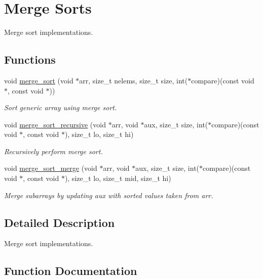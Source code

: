 \hypertarget{group__MergeSort}{}\section{Merge Sorts}
\label{group__MergeSort}


Merge sort implementations.  


\subsection*{Functions}
\begin{DoxyCompactItemize}
\item 
void \hyperlink{group__MergeSort_ga9e7f6cf0117297b84135e76a00711d82}{merge\+\_\+sort} (void $\ast$arr, size\+\_\+t nelems, size\+\_\+t size, int($\ast$compare)(const void $\ast$, const void $\ast$))
\begin{DoxyCompactList}\small\item\em Sort generic array using merge sort. \end{DoxyCompactList}\item 
void \hyperlink{group__MergeSort_ga4094395ddbe4c74b46b6f011a83ceb46}{merge\+\_\+sort\+\_\+recursive} (void $\ast$arr, void $\ast$aux, size\+\_\+t size, int($\ast$compare)(const void $\ast$, const void $\ast$), size\+\_\+t lo, size\+\_\+t hi)
\begin{DoxyCompactList}\small\item\em Recursively perform merge sort. \end{DoxyCompactList}\item 
void \hyperlink{group__MergeSort_ga1b4d8f0a083e4f0d30291ce8829ba6fe}{merge\+\_\+sort\+\_\+merge} (void $\ast$arr, void $\ast$aux, size\+\_\+t size, int($\ast$compare)(const void $\ast$, const void $\ast$), size\+\_\+t lo, size\+\_\+t mid, size\+\_\+t hi)
\begin{DoxyCompactList}\small\item\em Merge subarrays by updating aux with sorted values taken from arr. \end{DoxyCompactList}\end{DoxyCompactItemize}


\subsection{Detailed Description}
Merge sort implementations. 



\subsection{Function Documentation}
\mbox{\label{group__MergeSort_ga9e7f6cf0117297b84135e76a00711d82}} 
